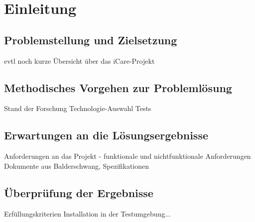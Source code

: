 
\section{Einleitung}


\subsection{Problemstellung und Zielsetzung}
evtl noch kurze Übersicht über das iCare-Projekt



\subsection{Methodisches Vorgehen zur Problemlösung}
Stand der Forschung
Technologie-Auswahl
Tests



\subsection{Erwartungen an die Lösungsergebnisse}
Anforderungen an das Projekt - funktionale und nichtfunktionale Anforderungen
Dokumente aus Balderschwang, Spezifikationen

\subsection{Überprüfung der Ergebnisse}
Erfüllungskriterien
Installation in der Testumgebung...









